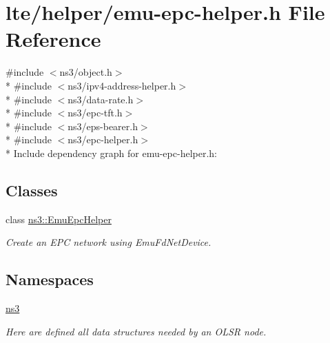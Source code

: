 \hypertarget{emu-epc-helper_8h}{}\section{lte/helper/emu-\/epc-\/helper.h File Reference}
\label{emu-epc-helper_8h}
{\ttfamily \#include $<$ns3/object.\+h$>$}\\*
{\ttfamily \#include $<$ns3/ipv4-\/address-\/helper.\+h$>$}\\*
{\ttfamily \#include $<$ns3/data-\/rate.\+h$>$}\\*
{\ttfamily \#include $<$ns3/epc-\/tft.\+h$>$}\\*
{\ttfamily \#include $<$ns3/eps-\/bearer.\+h$>$}\\*
{\ttfamily \#include $<$ns3/epc-\/helper.\+h$>$}\\*
Include dependency graph for emu-\/epc-\/helper.h\+:
\subsection*{Classes}
\begin{DoxyCompactItemize}
\item 
class \hyperlink{classns3_1_1EmuEpcHelper}{ns3\+::\+Emu\+Epc\+Helper}
\begin{DoxyCompactList}\small\item\em Create an E\+PC network using Emu\+Fd\+Net\+Device. \end{DoxyCompactList}\end{DoxyCompactItemize}
\subsection*{Namespaces}
\begin{DoxyCompactItemize}
\item 
 \hyperlink{namespacens3}{ns3}
\begin{DoxyCompactList}\small\item\em Here are defined all data structures needed by an O\+L\+SR node. \end{DoxyCompactList}\end{DoxyCompactItemize}
